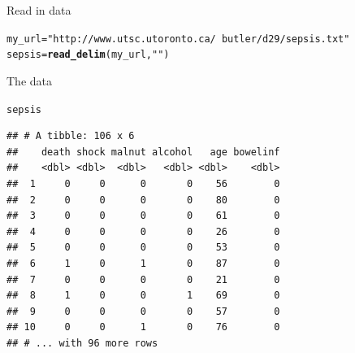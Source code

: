 \documentclass[unknownkeysallowed]{beamer}\usepackage[]{graphicx}\usepackage[]{color}
\makeatletter
\newcommand{\hlstr}[1]{\textcolor[rgb]{0.192,0.494,0.8}{#1}}%
\newcommand{\hlstd}[1]{\textcolor[rgb]{0.345,0.345,0.345}{#1}}%
\newcommand{\hlkwb}[1]{\textcolor[rgb]{0.69,0.353,0.396}{#1}}%
\newcommand{\hlkwd}[1]{\textcolor[rgb]{0.737,0.353,0.396}{\textbf{#1}}}%
\newenvironment{kframe}{%
 \def\at@end@of@kframe{}%
 \ifinner\ifhmode%
  \def\at@end@of@kframe{\end{minipage}}%
  \begin{minipage}{\columnwidth}%
 \fi\fi%
 \def\FrameCommand##1{\hskip\@totalleftmargin \hskip-\fboxsep
 \colorbox{shadecolor}{##1}\hskip-\fboxsep
     \hskip-\linewidth \hskip-\@totalleftmargin \hskip\columnwidth}%
 \MakeFramed {\advance\hsize-\width
   \@totalleftmargin\z@ \linewidth\hsize
   \@setminipage}}%
 {\par\unskip\endMakeFramed%
 \at@end@of@kframe}
\newenvironment{knitrout}{}{} %
\makeatother
\begin{document}
\begin{frame}[fragile]{Read in data}

 
\begin{knitrout}\footnotesize
{}\color{fgcolor}\begin{kframe}
\begin{alltt}
\hlstd{my_url}\hlkwb{=}\hlstr{"http://www.utsc.utoronto.ca/~butler/d29/sepsis.txt"}
\hlstd{sepsis}\hlkwb{=}\hlkwd{read_delim}\hlstd{(my_url,}\hlstr{" "}\hlstd{)}
\end{alltt}


{\ttfamily\noindent\itshape\color{messagecolor}{\#\# Parsed with column specification:\\\#\# cols(\\\#\#\ \  death = col\_double(),\\\#\#\ \  shock = col\_double(),\\\#\#\ \  malnut = col\_double(),\\\#\#\ \  alcohol = col\_double(),\\\#\#\ \  age = col\_double(),\\\#\#\ \  bowelinf = col\_double()\\\#\# )}}\end{kframe}
\end{knitrout}
  

\end{frame}

\begin{frame}[fragile]{The data}
  
\begin{knitrout}\footnotesize
{}\color{fgcolor}\begin{kframe}
\begin{alltt}
\hlstd{sepsis}
\end{alltt}
\begin{verbatim}
## # A tibble: 106 x 6
##    death shock malnut alcohol   age bowelinf
##    <dbl> <dbl>  <dbl>   <dbl> <dbl>    <dbl>
##  1     0     0      0       0    56        0
##  2     0     0      0       0    80        0
##  3     0     0      0       0    61        0
##  4     0     0      0       0    26        0
##  5     0     0      0       0    53        0
##  6     1     0      1       0    87        0
##  7     0     0      0       0    21        0
##  8     1     0      0       1    69        0
##  9     0     0      0       0    57        0
## 10     0     0      1       0    76        0
## # ... with 96 more rows
\end{verbatim}
\end{kframe}
\end{knitrout}
  
\end{frame}
\end{document}
